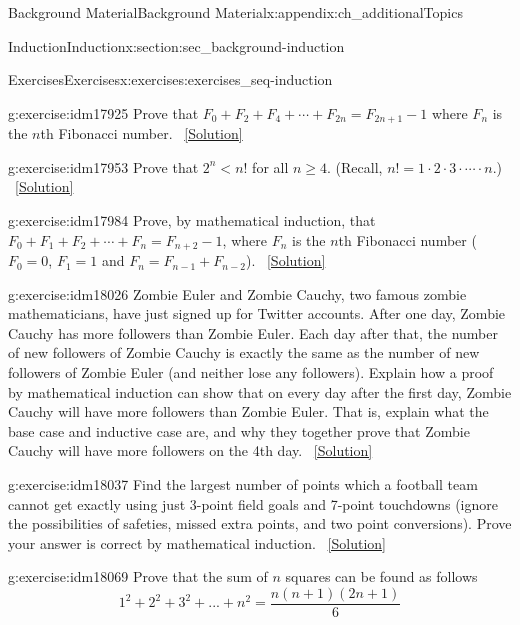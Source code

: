 \documentclass[oneside,10pt,]{book}
\numberwithin{equation}{chapter}
\newcommand{\lt}{<}
\begin{document}
\begin{appendixptx}{Background Material}{}{Background Material}{}{}{x:appendix:ch_additionalTopics}
\begin{sectionptx}{Induction}{}{Induction}{}{}{x:section:sec_background-induction}
\begin{exercises-subsection}{Exercises}{}{Exercises}{}{}{x:exercises:exercises_seq-induction}
\begin{divisionexercise}{4}{}{}{g:exercise:idm17925}
Prove that \(F_0 + F_2 + F_4 + \cdots + F_{2n} = F_{2n+1} - 1\) where \(F_n\) is the \(n\)th Fibonacci number.%
\qquad~\hfill{\tiny\hyperlink{g:solution:idm17931-main}{[Solution]}}\end{divisionexercise}%
\begin{divisionexercise}{5}{}{}{g:exercise:idm17953}%
Prove that \(2^n \lt  n!\) for all \(n \ge 4\). (Recall, \(n! = 1\cdot 2 \cdot 3 \cdot \cdots\cdot n\).)%
\qquad~\hfill{\tiny\hyperlink{g:solution:idm17959-main}{[Solution]}}\end{divisionexercise}%
\begin{divisionexercise}{6}{}{}{g:exercise:idm17984}%
Prove, by mathematical induction, that \(F_0 + F_1 + F_2 + \cdots + F_{n} = F_{n+2} - 1\), where \(F_n\) is the \(n\)th Fibonacci number (\(F_0 = 0\), \(F_1 = 1\) and \(F_n = F_{n-1} + F_{n-2}\)).%
\qquad~\hfill{\tiny\hyperlink{g:solution:idm17993-main}{[Solution]}}\end{divisionexercise}%
\begin{divisionexercise}{7}{}{}{g:exercise:idm18026}%
Zombie Euler and Zombie Cauchy, two famous zombie mathematicians, have just signed up for Twitter accounts. After one day, Zombie Cauchy has more followers than Zombie Euler. Each day after that, the number of new followers of Zombie Cauchy is exactly the same as the number of new followers of Zombie Euler (and neither lose any followers). Explain how a proof by mathematical induction can show that on every day after the first day, Zombie Cauchy will have more followers than Zombie Euler. That is, explain what the base case and inductive case are, and why they together prove that Zombie Cauchy will have more followers on the 4th day.%
\qquad~\hfill{\tiny\hyperlink{g:solution:idm18029-main}{[Solution]}}\end{divisionexercise}%
\begin{divisionexercise}{8}{}{}{g:exercise:idm18037}%
Find the largest number of points which a football team cannot get exactly using just 3-point field goals and 7-point touchdowns (ignore the possibilities of safeties, missed extra points, and two point conversions). Prove your answer is correct by mathematical induction.%
\qquad~\hfill{\tiny\hyperlink{g:solution:idm18040-main}{[Solution]}}\end{divisionexercise}%
\begin{divisionexercise}{9}{}{}{g:exercise:idm18069}%
Prove that the sum of \(n\) squares can be found as follows%
\begin{equation*}
1^2 +2^2 +3^2+...+n^2 = \frac{n(n+1)(2n+1)}{6}

\end{equation*}
\end{divisionexercise}
\end{exercises-subsection}
\end{sectionptx}
\end{appendixptx}
\end{document}
